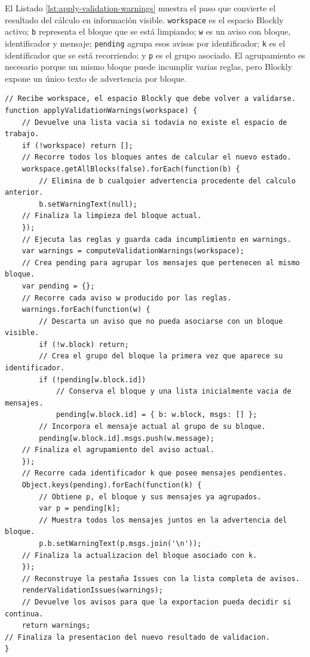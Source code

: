 El Listado \ref{lst:apply-validation-warnings} muestra el paso que convierte el
resultado del cálculo en información visible. \texttt{workspace} es el espacio
Blockly activo; \texttt{b} representa el bloque que se está limpiando;
\texttt{w} es un aviso con bloque, identificador y mensaje;
\texttt{pending} agrupa esos avisos por identificador; \texttt{k} es el
identificador que se está recorriendo; y \texttt{p} es el grupo asociado. El
agrupamiento es necesario porque un mismo bloque puede incumplir varias reglas,
pero Blockly expone un único texto de advertencia por bloque.

\begin{lstlisting}[style=tfmjavascript, caption={Presentación de los avisos de validación comentada línea a línea}, label={lst:apply-validation-warnings}]
// Recibe workspace, el espacio Blockly que debe volver a validarse.
function applyValidationWarnings(workspace) {
    // Devuelve una lista vacia si todavia no existe el espacio de trabajo.
    if (!workspace) return [];
    // Recorre todos los bloques antes de calcular el nuevo estado.
    workspace.getAllBlocks(false).forEach(function(b) {
        // Elimina de b cualquier advertencia procedente del calculo anterior.
        b.setWarningText(null);
    // Finaliza la limpieza del bloque actual.
    });
    // Ejecuta las reglas y guarda cada incumplimiento en warnings.
    var warnings = computeValidationWarnings(workspace);
    // Crea pending para agrupar los mensajes que pertenecen al mismo bloque.
    var pending = {};
    // Recorre cada aviso w producido por las reglas.
    warnings.forEach(function(w) {
        // Descarta un aviso que no pueda asociarse con un bloque visible.
        if (!w.block) return;
        // Crea el grupo del bloque la primera vez que aparece su identificador.
        if (!pending[w.block.id])
            // Conserva el bloque y una lista inicialmente vacia de mensajes.
            pending[w.block.id] = { b: w.block, msgs: [] };
        // Incorpora el mensaje actual al grupo de su bloque.
        pending[w.block.id].msgs.push(w.message);
    // Finaliza el agrupamiento del aviso actual.
    });
    // Recorre cada identificador k que posee mensajes pendientes.
    Object.keys(pending).forEach(function(k) {
        // Obtiene p, el bloque y sus mensajes ya agrupados.
        var p = pending[k];
        // Muestra todos los mensajes juntos en la advertencia del bloque.
        p.b.setWarningText(p.msgs.join('\n'));
    // Finaliza la actualizacion del bloque asociado con k.
    });
    // Reconstruye la pestaña Issues con la lista completa de avisos.
    renderValidationIssues(warnings);
    // Devuelve los avisos para que la exportacion pueda decidir si continua.
    return warnings;
// Finaliza la presentacion del nuevo resultado de validacion.
}
\end{lstlisting}

